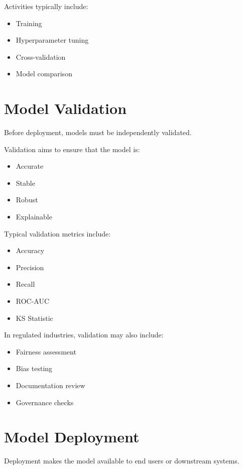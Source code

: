 Activities typically include:

\begin{itemize}
    \item Training
    \item Hyperparameter tuning
    \item Cross-validation
    \item Model comparison
\end{itemize}

\section{Model Validation}

Before deployment, models must be independently validated.

Validation aims to ensure that the model is:

\begin{itemize}
    \item Accurate
    \item Stable
    \item Robust
    \item Explainable
\end{itemize}

Typical validation metrics include:

\begin{itemize}
    \item Accuracy
    \item Precision
    \item Recall
    \item ROC-AUC
    \item KS Statistic
\end{itemize}

In regulated industries, validation may also include:

\begin{itemize}
    \item Fairness assessment
    \item Bias testing
    \item Documentation review
    \item Governance checks
\end{itemize}

\section{Model Deployment}

Deployment makes the model available to end users or downstream systems.

